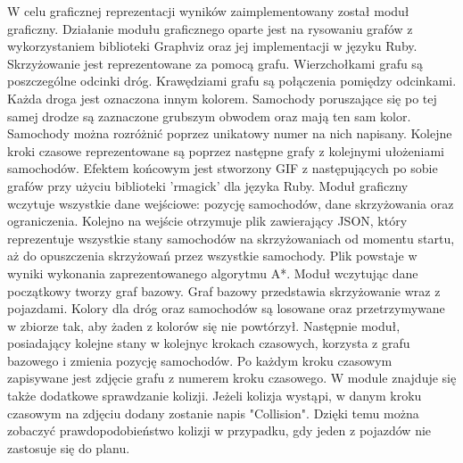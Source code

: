 W celu graficznej reprezentacji wyników zaimplementowany został moduł graficzny.
\newline
\newline
Działanie modułu graficznego oparte jest na rysowaniu grafów z wykorzystaniem biblioteki Graphviz oraz jej implementacji w języku Ruby.
\newline
\newline
Skrzyżowanie jest reprezentowane za pomocą grafu. Wierzchołkami grafu są poszczególne odcinki dróg. Krawędziami grafu są połączenia pomiędzy odcinkami.
\newline
\newline
Każda droga jest oznaczona innym kolorem.
\newline
\newline
Samochody poruszające się po tej samej drodze są zaznaczone grubszym obwodem oraz mają ten sam kolor. Samochody można rozróżnić poprzez unikatowy numer na nich napisany.
\newline
\newline
Kolejne kroki czasowe reprezentowane są poprzez następne grafy z kolejnymi ułożeniami samochodów.
\newline
\newline
Efektem końcowym jest stworzony GIF z następujących po sobie grafów przy użyciu biblioteki 'rmagick' dla języka Ruby.
\newline
\newline
Moduł graficzny wczytuje wszystkie dane wejściowe: pozycję samochodów, dane skrzyżowania oraz ograniczenia. Kolejno na wejście otrzymuje plik zawierający JSON, który reprezentuje wszystkie stany samochodów na skrzyżowaniach od momentu startu, aż do opuszczenia skrzyżowań przez wszystkie samochody. Plik powstaje w wyniki wykonania zaprezentowanego algorytmu A*.
\newline
\newline
Moduł wczytując dane początkowy tworzy graf bazowy. Graf bazowy przedstawia skrzyżowanie wraz z pojazdami. Kolory dla dróg oraz samochodów są losowane oraz przetrzymywane w zbiorze tak, aby żaden z kolorów się nie powtórzył.
\newline
\newline
Następnie moduł, posiadający kolejne stany w kolejnyc krokach czasowych, korzysta z grafu bazowego i zmienia pozycję samochodów. Po każdym kroku czasowym zapisywane jest zdjęcie grafu z numerem kroku czasowego.
\newline
\newline
W module znajduje się także dodatkowe sprawdzanie kolizji. Jeżeli kolizja wystąpi, w danym kroku czasowym na zdjęciu dodany zostanie napis "Collision". Dzięki temu można zobaczyć prawdopodobieństwo kolizji w przypadku, gdy jeden z pojazdów nie zastosuje się do planu.
